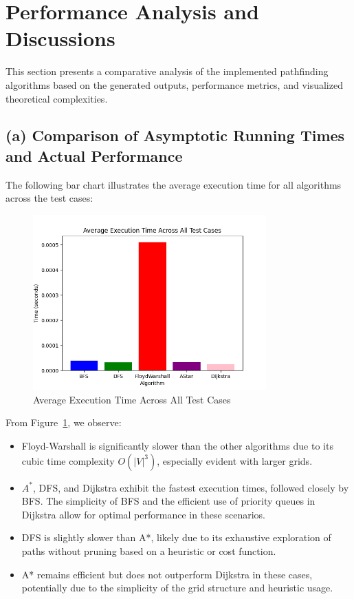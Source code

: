 \documentclass[12pt]{article}
\begin{document}
\section{Performance Analysis and Discussions}
This section presents a comparative analysis of the implemented pathfinding algorithms based on the generated outputs, performance metrics, and visualized theoretical complexities. 

\subsection{(a) Comparison of Asymptotic Running Times and Actual Performance}
The following bar chart illustrates the average execution time for all algorithms across the test cases:
\begin{figure}[h!]
    \centering
    \includegraphics[width=0.8\textwidth]{average_execution_time.png}
    \caption{Average Execution Time Across All Test Cases}
    \label{fig:execution_time}
\end{figure}

\noindent From Figure~\ref{fig:execution_time}, we observe:
\begin{itemize}
    \item Floyd-Warshall is significantly slower than the other algorithms due to its cubic time complexity \( O(|V|^3) \), especially evident with larger grids.
    \item $A^*$, DFS, and Dijkstra exhibit the fastest execution times, followed closely by BFS. The simplicity of BFS and the efficient use of priority queues in Dijkstra allow for optimal performance in these scenarios.
    \item DFS is slightly slower than A*, likely due to its exhaustive exploration of paths without pruning based on a heuristic or cost function.
    \item A* remains efficient but does not outperform Dijkstra in these cases, potentially due to the simplicity of the grid structure and heuristic usage.
\end{itemize}
\end{document}
